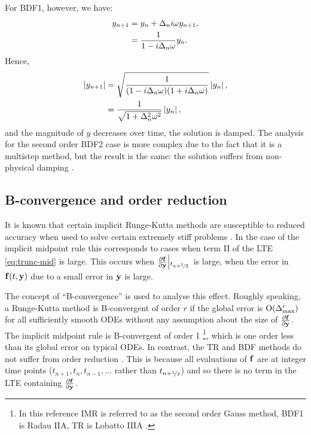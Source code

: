 For BDF1, however, we have:
\begin{equation}
  \begin{aligned}
    y_{n+1} &= y_n + \Delta_{n} i \omega y_{n+1}, \\
    &= \frac{1}{1 - i \Delta_{n} \omega} y_n.
  \end{aligned}
\end{equation}
Hence,
\begin{equation}
  \begin{aligned}
    \left|{y_{n+1}} \right| &= \sqrt{ \frac{1}{(1 - i \Delta_{n} \omega)(1 + i \Delta_{n} \omega)}} \left|{y_n} \right|, \\
    &= \frac{1}{\sqrt{1 + \Delta_{n}^2 \omega^2}} \left|{y_n} \right|, \\
  \end{aligned}
\end{equation}
and the magnitude of $y$ decreases over time, \ie the solution is damped.
The analysis for the second order BDF2 case is more complex due to the fact that it is a multistep method, but the result is the same: the solution suffers from non-physical damping \cite[265]{GreshoSani}.


\subsection{B-convergence and order reduction}
\label{sec:order-reduction}

It is known that certain implicit Runge-Kutta methods are susceptible to reduced accuracy when used to solve certain extremely stiff problems \cite[156]{Atkinson1994} \cite[225]{HairerWanner}.
In the case of the implicit midpoint rule this corresponds to cases when term II of the LTE \cref{eq:trunc-mid} is large. 
This occurs when $\frac{\partial {\mathbf{f}}}{\partial \mathbf{y}}{\left|_{t_{n+\nicefrac{1}{2}}{}}\right.}$ is large, \ie when the error in ${\mathbf{f}{\left( t, \mathbf{y} \right)}}$ due to a small error in $\mathbf{y}$ is large.

The concept of ``B-convergence'' is used to analyse this effect.
Roughly speaking, a Runge-Kutta method is B-convergent of order $r$ if the global error is  $\text{O}{\left( \Delta_{\text{max}}^r \right)}$ for all sufficiently smooth ODEs without any assumption about the size of $\frac{\partial {\mathbf{f}}}{\partial \mathbf{y}}$.
The implicit midpoint rule is B-convergent of order 1 \cite[231]{HairerWanner}\footnote{In this reference IMR is referred to as the second order Gauss method, BDF1 is Radau IIA, TR is Lobatto IIIA \cite[72-76]{HairerWanner}.}, which is one order less than its global error on typical ODEs.
In contrast, the TR and BDF methods do not suffer from order reduction \cite[159]{Atkinson1994}.
This is because all evaluations of ${\mathbf{f}}$ are at integer time points (\ie $t_{n+1}, t_{n}, t_{n-1}, \ldots$ rather than $t_{n+\nicefrac{1}{2}}$) and so there is no term in the LTE containing $\frac{\partial {\mathbf{f}}}{\partial \mathbf{y}}$.

